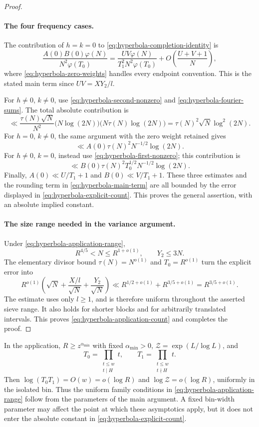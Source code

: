 \begin{proof}
\paragraph{The four frequency cases.}
The contribution of $h=k=0$ to
\eqref{eq:hyperbola-completion-identity} is
\begin{equation}
\label{eq:hyperbola-main-term}
 \frac{A(0)B(0)\varphi(N)}{N^2\varphi(T_0)}
 =\frac{UV\varphi(N)}{T_1^2N^2\varphi(T_0)}
   +O\left(\frac{U+V+1}{N}\right),
\end{equation}
where \eqref{eq:hyperbola-zero-weights} handles every endpoint
convention.  This is the stated main term since $UV=XY_2/l$.

For $h\ne0$, $k\ne0$, use
\eqref{eq:hyperbola-second-nonzero} and
\eqref{eq:hyperbola-fourier-sums}.  The total absolute contribution is
\[
 \ll\frac{\tau(N)\sqrt N}{N^2}
       \bigl(N\log(2N)\bigr)
       \bigl(N\tau(N)\log(2N)\bigr)
 =\tau(N)^2\sqrt N\log^2(2N).
\]
For $h=0$, $k\ne0$, the same argument with the zero weight retained
gives
\[
 \ll A(0)\tau(N)^2N^{-1/2}\log(2N).
\]
For $h\ne0$, $k=0$, instead use
\eqref{eq:hyperbola-first-nonzero}; this contribution is
\[
 \ll B(0)\tau(N)^2T_0^{1/2}N^{-1/2}\log(2N).
\]
Finally, $A(0)\ll U/T_1+1$ and $B(0)\ll V/T_1+1$.
These three estimates and the rounding term in
\eqref{eq:hyperbola-main-term} are all bounded by the error displayed
in \eqref{eq:hyperbola-explicit-count}.  This proves the general
assertion, with an absolute implied constant.

\paragraph{The size range needed in the variance argument.}
Under \eqref{eq:hyperbola-application-range},
\[
 R^{4/5}<N\le R^{1+o(1)},\qquad Y_2\le3N.
\]
The elementary divisor bound $\tau(N)=N^{o(1)}$ and $T_0=R^{o(1)}$
turn the explicit error into
\[
 R^{o(1)}\left(\sqrt N+\frac{X/l}{\sqrt N}
                           +\frac{Y_2}{\sqrt N}\right)
 \ll R^{1/2+o(1)}+R^{3/5+o(1)}
 =R^{3/5+o(1)}.
\]
The estimate uses only $l\ge1$, and is therefore uniform throughout
the asserted sieve range.  It also holds for shorter blocks and for
arbitrarily translated intervals.  This proves
\eqref{eq:hyperbola-application-count} and completes the proof.
\end{proof}

\begin{remark}
\label{rem:hyperbola-small-patterns}
In the application, $R\ge z^{\alpha_{\min}}$ with fixed
$\alpha_{\min}>0$,
$\mathcal Z=\exp(L/\log L)$, and
\[
 T_0=\prod_{\substack{t\le w\\t\mid H}}t,\qquad
 T_1=\prod_{\substack{t\le w\\t\nmid H}}t.
\]
Then $\log(T_0T_1)=O(w)=o(\log R)$ and
$\log\mathcal Z=o(\log R)$, uniformly in the isolated bin.
Thus the uniform family conditions in
\eqref{eq:hyperbola-application-range} follow from the parameters of
the main argument.  A fixed bin-width parameter may affect the point
at which these asymptotics apply, but it does not enter the absolute
constant in \eqref{eq:hyperbola-explicit-count}.
\end{remark}
